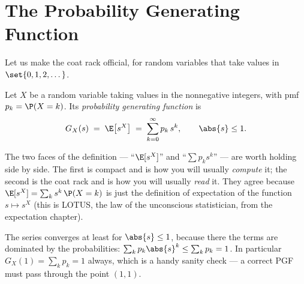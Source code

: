 \section{The Probability Generating Function}
\label{ch18:pgf}

Let us make the coat rack official, for random variables that take values in
$\set{0,1,2,\dots}$.

\begin{definition}
\label{ch18:def-pgf}
Let $X$ be a random variable taking values in the nonnegative integers, with
pmf $p_k=\P(X=k)$. Its \emph{probability generating function} is
\[
  G_X(s) \;=\; \E\!\left[s^X\right] \;=\; \sum_{k=0}^{\infty} p_k\, s^k ,
  \qquad \abs{s}\le 1 .
\]
\end{definition}

The two faces of the definition --- ``$\E[s^X]$'' and ``$\sum p_k s^k$'' --- are
worth holding side by side. The first is compact and is how you will usually
\emph{compute} it; the second is the coat rack and is how you will usually
\emph{read} it. They agree because $\E[s^X]=\sum_k s^k\,\P(X=k)$ is just the
definition of expectation of the function $s\mapsto s^X$ (this is LOTUS, the law
of the unconscious statistician, from the expectation chapter).

The series converges at least for $\abs{s}\le 1$, because there the terms are
dominated by the probabilities: $\sum_k p_k \abs{s}^k \le \sum_k p_k = 1$.
In particular $G_X(1)=\sum_k p_k = 1$ always, which is a handy sanity check ---
a correct PGF must pass through the point $(1,1)$.

